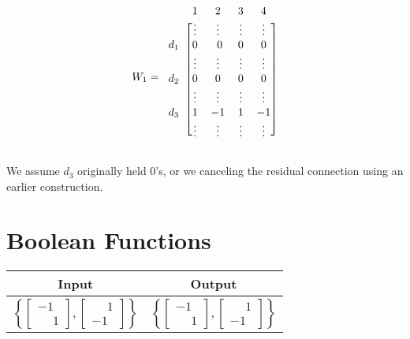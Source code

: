     \begin{equation*}
    W_1=
    \begin{blockarray}{ccccc}
        & 1& 2& 3&4 \\
        \begin{block}{c[cccc]}
                & \vdots &\vdots & \vdots & \vdots \\
                d_1 & 0 &\ 0 & 0 & 0 \\
                & \vdots &\vdots & \vdots & \vdots \\
                d_2 & 0 & 0 & 0 & 0 \\
                & \vdots &\vdots & \vdots & \vdots \\
                d_3 & 1  & -1 & 1 & -1 \\
                & \vdots &\vdots & \vdots & \vdots \\
        \end{block}
    \end{blockarray}
    \end{equation*}

    We assume $d_3$ originally held $0$'s, or we canceling the residual connection using an earlier construction.
    
\section{Boolean Functions}
\label{sec:ffnn_boolean}

    \begin{tabular}{|c|c|}
        \hline
        \rowcolor{orange!20} %
        \textbf{Input} & \textbf{Output} \\
        \hline
        $\left\{\begin{bmatrix}
            -1\\\phantom- 1
        \end{bmatrix}, \begin{bmatrix}
            \phantom- 1\\-1
        \end{bmatrix}\right\}$ & $\left\{\begin{bmatrix}
            -1\\\phantom- 1
        \end{bmatrix}, \begin{bmatrix}
            \phantom- 1\\-1
        \end{bmatrix}\right\}$ \\
        \hline
    \end{tabular}

